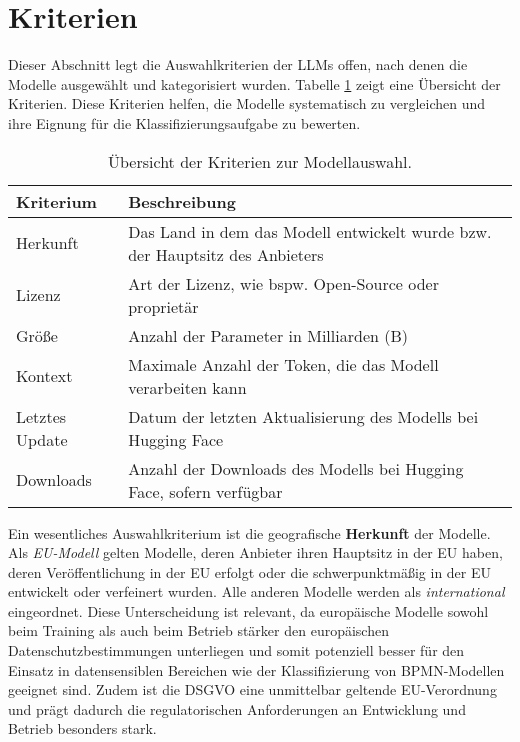\section{Kriterien}\label{sec:kriterien}

Dieser Abschnitt legt die Auswahlkriterien der \acp{LLM} offen, nach denen die Modelle ausgewählt und kategorisiert wurden. Tabelle \ref{tab:kriterien} zeigt eine Übersicht der Kriterien. Diese Kriterien helfen, die Modelle systematisch zu vergleichen und ihre Eignung für die Klassifizierungsaufgabe zu bewerten.

\begin{table}[htbp]
    \centering
    \caption{Übersicht der Kriterien zur Modellauswahl.}
    \label{tab:kriterien}
    \begin{tabularx}{\textwidth}{p{} p{}}
        \toprule
        \textbf{Kriterium} & \textbf{Beschreibung} \\
        \midrule
        Herkunft & Das Land in dem das Modell entwickelt wurde bzw. der Hauptsitz des Anbieters \\
        Lizenz & Art der Lizenz, wie bspw. Open-Source oder proprietär \\
        Größe & Anzahl der Parameter in Milliarden (B) \\
        Kontext & Maximale Anzahl der Token, die das Modell verarbeiten kann \\
        Letztes Update & Datum der letzten Aktualisierung des Modells bei Hugging Face \cite{huggingface} \\
        Downloads & Anzahl der Downloads des Modells bei Hugging Face, sofern verfügbar \\
        \bottomrule
    \end{tabularx}
\end{table}

\newpage
Ein wesentliches Auswahlkriterium ist die geografische \textbf{Herkunft} der Modelle. Als \emph{\ac{EU}-Modell} gelten Modelle, deren Anbieter ihren Hauptsitz in der \ac{EU} haben, deren Veröffentlichung in der \ac{EU} erfolgt oder die schwerpunktmäßig in der \ac{EU} entwickelt oder verfeinert wurden. Alle anderen Modelle werden als \emph{international} eingeordnet. Diese Unterscheidung ist relevant, da europäische Modelle sowohl beim Training als auch beim Betrieb stärker den europäischen Datenschutzbestimmungen unterliegen und somit potenziell besser für den Einsatz in datensensiblen Bereichen wie der Klassifizierung von \ac{BPMN}-Modellen geeignet sind. Zudem ist die \ac{DSGVO} eine unmittelbar geltende \ac{EU}-Verordnung und prägt dadurch die regulatorischen Anforderungen an Entwicklung und Betrieb besonders stark.

